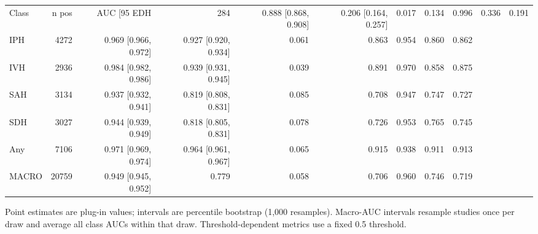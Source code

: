 \begin{tabular}{lrrrrrrrr}
\toprule
Class & n pos & AUC [95%
\midrule
EDH & 284 & 0.888 [0.868, 0.908] & 0.206 [0.164, 0.257] & 0.017 & 0.134 & 0.996 & 0.336 & 0.191 \\
IPH & 4272 & 0.969 [0.966, 0.972] & 0.927 [0.920, 0.934] & 0.061 & 0.863 & 0.954 & 0.860 & 0.862 \\
IVH & 2936 & 0.984 [0.982, 0.986] & 0.939 [0.931, 0.945] & 0.039 & 0.891 & 0.970 & 0.858 & 0.875 \\
SAH & 3134 & 0.937 [0.932, 0.941] & 0.819 [0.808, 0.831] & 0.085 & 0.708 & 0.947 & 0.747 & 0.727 \\
SDH & 3027 & 0.944 [0.939, 0.949] & 0.818 [0.805, 0.831] & 0.078 & 0.726 & 0.953 & 0.765 & 0.745 \\
Any & 7106 & 0.971 [0.969, 0.974] & 0.964 [0.961, 0.967] & 0.065 & 0.915 & 0.938 & 0.911 & 0.913 \\
MACRO & 20759 & 0.949 [0.945, 0.952] & 0.779 & 0.058 & 0.706 & 0.960 & 0.746 & 0.719 \\
\bottomrule
\end{tabular}

\vspace{2pt}
{\footnotesize Point estimates are plug-in values; intervals are percentile bootstrap (1,000 resamples). Macro-AUC intervals resample studies once per draw and average all class AUCs within that draw. Threshold-dependent metrics use a fixed 0.5 threshold.}

